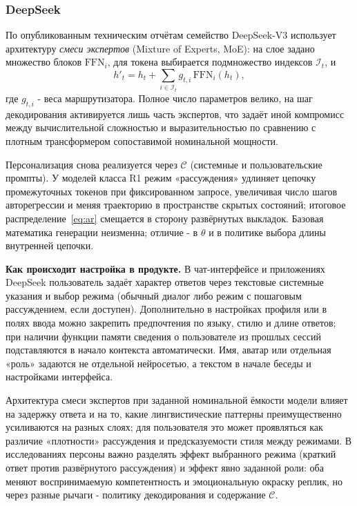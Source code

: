 \documentclass[areasetadvanced]{scrartcl}
\begin{document}
\subsubsection{DeepSeek}

По опубликованным техническим отчётам семейство DeepSeek-V3 использует архитектуру \emph{смеси экспертов} (Mixture of Experts, MoE): на слое задано множество блоков $\mathrm{FFN}_i$, для токена выбирается подмножество индексов $\mathcal{I}_t$, и
\begin{equation}
h'_t = h_t + \sum_{i \in \mathcal{I}_t} g_{t,i}\,\mathrm{FFN}_i(h_t),
\label{eq:moe}
\end{equation}
где $g_{t,i}$ - веса маршрутизатора. Полное число параметров велико, на шаг декодирования активируется лишь часть экспертов, что задаёт иной компромисс между вычислительной сложностью и выразительностью по сравнению с плотным трансформером сопоставимой номинальной мощности.

Персонализация снова реализуется через $\mathcal{C}$ (системные и пользовательские промпты). У моделей класса R1 режим «рассуждения» удлиняет цепочку промежуточных токенов при фиксированном запросе, увеличивая число шагов авторегрессии и меняя траекторию в пространстве скрытых состояний; итоговое распределение~\eqref{eq:ar} смещается в сторону развёрнутых выкладок. Базовая математика генерации неизменна; отличие - в $\theta$ и в политике выбора длины внутренней цепочки.

\textbf{Как происходит настройка в продукте.} В чат-интерфейсе и приложениях DeepSeek пользователь задаёт характер ответов через текстовые системные указания и выбор режима (обычный диалог либо режим с пошаговым рассуждением, если доступен). Дополнительно в настройках профиля или в полях ввода можно закрепить предпочтения по языку, стилю и длине ответов; при наличии функции памяти сведения о пользователе из прошлых сессий подставляются в начало контекста автоматически. Имя, аватар или отдельная «роль» задаются не отдельной нейросетью, а текстом в начале беседы и настройками интерфейса.

Архитектура смеси экспертов при заданной номинальной ёмкости модели влияет на задержку ответа и на то, какие лингвистические паттерны преимущественно усиливаются на разных слоях; для пользователя это может проявляться как различие «плотности» рассуждения и предсказуемости стиля между режимами. В исследованиях персоны важно разделять эффект выбранного режима (краткий ответ против развёрнутого рассуждения) и эффект явно заданной роли: оба меняют воспринимаемую компетентность и эмоциональную окраску реплик, но через разные рычаги - политику декодирования и содержание $\mathcal{C}$.
\end{document}

